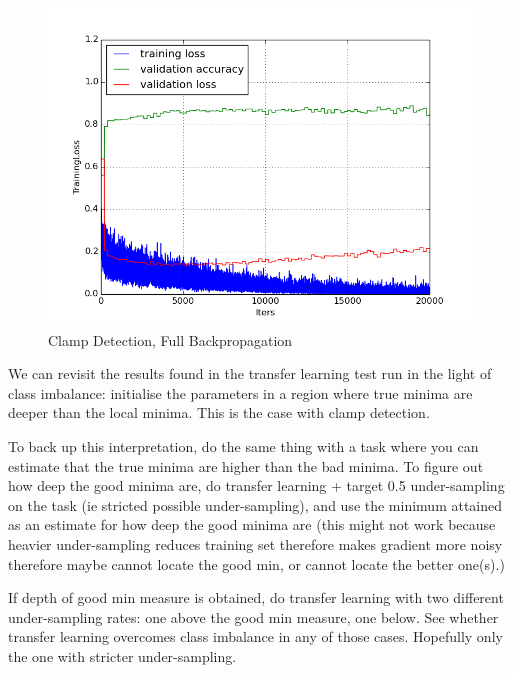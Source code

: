 \documentclass[a4paper,11pt]{article}
\begin{document}
\begin{figure}[h!]
	\centering
	\includegraphics[scale=0.5]{images/plot_clampdet_none.png}
	\caption{Clamp Detection, Full Backpropagation}
\end{figure}

We can revisit the results found in the transfer learning test run in the light of class imbalance: initialise the parameters in a region where true minima are deeper than the local minima. This is the case with clamp detection.

To back up this interpretation, do the same thing with a task where you can estimate that the true minima are higher than the bad minima. To figure out how deep the good minima are, do transfer learning + target 0.5 under-sampling on the task (ie stricted possible under-sampling), and use the minimum attained as an estimate for how deep the good minima are (this might not work because heavier under-sampling reduces training set therefore makes gradient more noisy therefore maybe cannot locate the good min, or cannot locate the better one(s).) 

If depth of good min measure is obtained, do transfer learning with two different under-sampling rates: one above the good min measure, one below. See whether transfer learning overcomes class imbalance in any of those cases. Hopefully only the one with stricter under-sampling. \\

\end{document}
